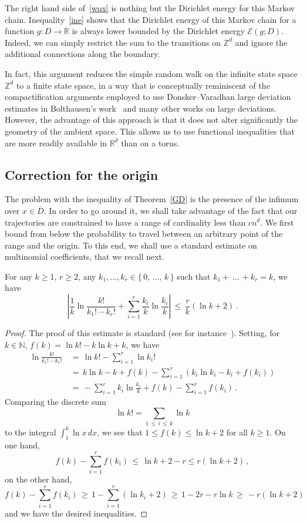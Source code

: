 \documentclass[AHL, Unicode, longabstracts, published]{cedram}
\newcommand*\bD{\overline{D}}
\newcommand*\R{\mathbb{R}}
\begin{document}
The right hand side of~\eqref{wqx} is nothing but the Dirichlet energy for this Markov chain. Inequality~\eqref{ine} shows that the Dirichlet energy of this Markov chain for a function $g: D \to \R$ is always lower bounded by the Dirichlet energy $\mathcal{E}(g; D)$. Indeed, we can simply restrict the sum to the transitions on $\mathbb{Z}^d$ and ignore the additional connections along the boundary.

In fact, this argument reduces the simple random walk on the infinite state space $\mathbb{Z}^d$ to a finite state space, in a way that is conceptually reminiscent of the compactification arguments employed to use Donsker--Varadhan large deviation estimates in Bolthausen's work~\cite{BO} and many other works on large deviations. However, the advantage of this approach is that it does not alter significantly the geometry of the ambient space. This allows us to use functional inequalities that are more readily available in $\R^d$ than on a torus.

\subsection{Correction for the origin}\label{corr}
The problem with the inequality of Theorem~\ref{GD} is the presence of the infimum over $x\in\bD$. In order to go around it, we shall take advantage of the fact that our trajectories are constrained to have a range of cardinality less than $cn^d$. We first bound from below the probability to travel between an arbitrary point of the range and the origin. To this end, we shall use a standard estimate on multinomial coefficients, that we recall next.
\begin{lemm}\label{lf}
For any $k\geq 1$, $r\geq 2$, any $k_1,\dots,k_r\in\{\,0,\,\dots,\,k\,\}$ such that $k_1+\,\dots\,+k_r=k$, we have
\[
\left|\frac{1}{k}\ln
\frac{k!}{ k_1!\,\cdots\,k_r!} +\sum_{i=1}^r
\frac{k_i}{ k}\ln \frac{k_i}{ k}
\right|
\,\leq\,
\frac{r}{ k}(\ln k+2)
\,.
\]
\end{lemm}
%

\begin{proof}
The proof of this estimate is standard (see for instance~\cite{EL}). Setting, for $k\in\mathbb N$, $f(k)=\ln k!-k\ln k+k$, we have
\begin{align*}
\ln\frac{k!}{ k_1!\,\cdots\,k_r!}
\,&=\,\ln k!-\sum_{i=1}^r\ln k_i!\\
\,&=\,k\ln k-k+f(k)-\sum_{i=1}^r(k_i\ln k_i-k_i+f(k_i))\\
\,&=\,-\sum_{i=1}^r {k_i}\ln \frac{k_i}{k} +f(k)-\sum_{i=1}^rf(k_i)\,.
\end{align*}
Comparing the discrete sum
\[
\ln k!=\sum_{1\,\leq\,i\,\leq\,k}\ln k
\]
to the integral $\int_1^k\ln x\,dx$, we see that $1\leq f(k)\leq \ln k +2$ for all $k\geq 1$. On one hand,
\[
f(k)-\sum_{i=1}^rf(k_i)\,\leq\, \ln k+2-r\leq r(\ln k+2)\,,
\]
on the other hand,
\[
f(k)-\sum_{i=1}^rf(k_i)\,\geq\, 1-
\sum_{i=1}^r(\ln k_i+2)\,\geq\,
1-2r-r\ln k\,\geq\, -r(\ln k+2)\,
\]
and we have the desired inequalities.
\end{proof}
\end{document}
